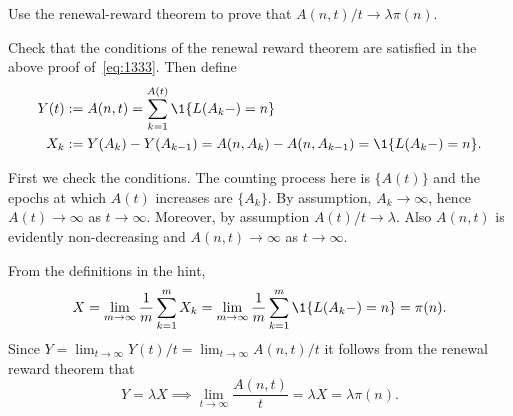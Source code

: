 \begin{exercise}\label{ex:18}
Use the renewal-reward theorem to prove that $A(n,t)/t \to \lambda \pi(n)$.
\begin{hint}
Check that the conditions of the renewal reward theorem are satisfied in the above proof of~\cref{eq:1333}. Then define
\begin{align*}
 Y(t) &:= A(n,t) = \sum_{k=1}^{A(t)} \1{\L(A_k-) = n} \\
X_k &:= Y(A_k) - Y(A_{k-1}) = A(n, A_k) - A(n, A_{k-1}) = \1{\L(A_k-)=n}.
\end{align*}

\end{hint}
\begin{solution}
First we check the conditions. The counting process here is $\{A(t)\}$ and the epochs at which
 $A(t)$ increases are $\{A_k\}$. By assumption, $A_k\to\infty$,
 hence $A(t)\to\infty$ as $t\to\infty$. Moreover, by assumption
 $A(t)/t \to \lambda$. Also $A(n,t)$ is evidently non-decreasing and
 $A(n,t)\to\infty$ as $t\to\infty$.


From the definitions in the hint,
\begin{equation*}
X= \lim_{m\to\infty} \frac 1 m \sum_{k=1}^m X_k =\lim_{m\to\infty} \frac 1 m \sum_{k=1}^m \1{\L(A_k-)=n} = \pi(n).
\end{equation*}
Since $Y=\lim_{t\to\infty} Y(t)/t = \lim_{t\to\infty} A(n,t)/t$ it follows from the renewal reward theorem that
\begin{equation*}
 Y=\lambda X \implies \lim_{t\to\infty} \frac{A(n,t)} t = \lambda X = \lambda \pi(n).
\end{equation*}
\end{solution}
\end{exercise}

